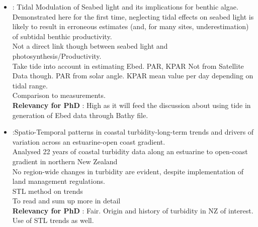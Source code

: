 \documentclass[]{report}
\begin{document}
		\begin{itemize}
			
		\item \cite{roberts2018tidal} : Tidal Modulation of Seabed light and its implications for benthic algae.
		\\ Demonstrated here for the first time, neglecting tidal effects on seabed light is likely to result in erroneous estimates (and, for many sites, underestimation) of subtidal benthic productivity.
		\\ Not a direct link though between seabed light and photosynthesis/Productivity.
		\\ Take tide into account in estimating Ebed. PAR, KPAR Not from Satellite Data though. PAR from solar angle. KPAR mean value per day depending on tidal range.
		\\ Comparison to measurements. 
		\\\textbf{Relevancy for PhD} : High as it will feed the discussion about using tide in generation of Ebed data through Bathy file.
		
		\item \cite{seers2015spatio} :Spatio-Temporal patterns in coastal turbidity-long-term trends and drivers of variation across an estuarine-open coast gradient.
		\\Analysed 22 years of coastal turbidity data along an estuarine to open-coast gradient in northern New Zealand
		\\ No region-wide changes in turbidity are evident, despite implementation of land management regulations.
		\\STL method on trends
		\\To read and sum up more in detail
		\\\textbf{Relevancy for PhD} : Fair. Origin and history of turbidity in NZ of interest. Use of STL trends as well.
		

\end{itemize}
\end{document}
